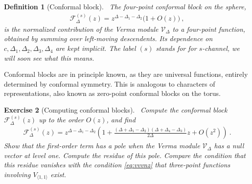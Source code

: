 \documentclass[12pt, a4paper]{article}
\theoremstyle{break}
\newtheorem{exo}{Exercise}[section]
\newtheorem{defn}[exo]{Definition}
\begin{document}
\begin{defn}[Conformal block]
 ~\label{def:block}
 The four-point conformal block on the sphere,
 \begin{align}
  \mathcal{F}^{(s)}_\Delta(z) = z^{\Delta-\Delta_1-\Delta_2}\Big( 1 + O(z) \Big)\ ,
  \label{eq:gsd}
 \end{align}
is the normalized contribution of the Verma module $\mathcal V_\Delta$ to a four-point function, obtained by summing over left-moving descendents. Its dependence on $c,\Delta_1,\Delta_2,\Delta_3,\Delta_4$ are kept implicit. The label $(s)$ stands for for $s$-channel, we will soon see what this means.
\end{defn}
Conformal blocks are in principle known, as they are universal functions, entirely determined by conformal symmetry. This is analogous to characters of representations, also known as zero-point conformal blocks on the torus.

\begin{exo}[Computing conformal blocks]
 ~\label{exo:block}
 Compute the conformal block $ \mathcal{F}^{(s)}_\Delta(z)$ up to the order $O(z)$, and find
 \begin{align}
  \mathcal{F}^{(s)}_\Delta(z) = z^{\Delta-\Delta_1-\Delta_2}\left( 1 + \frac{(\Delta+\Delta_1-\Delta_2)(\Delta+\Delta_4-\Delta_3)}{2\Delta}z + O(z^2) \right)\ .
 \end{align}
 Show that the first-order term has a pole when the Verma module $\mathcal{V}_\Delta$ has a null vector at level one.
 Compute the residue of this pole. Compare the condition that this residue vanishes with the condition \eqref{eq:vvvnz} that three-point functions involving $V_{\langle 1,1\rangle}$ exist.
\end{exo}
\end{document}
